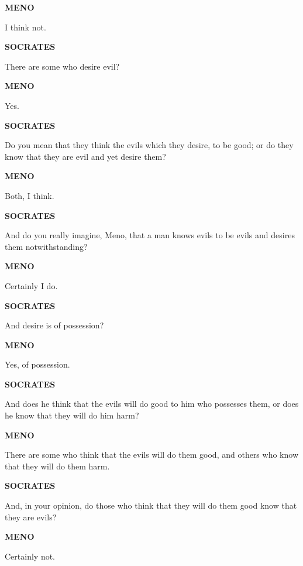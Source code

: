 \documentclass[11pt,letter]{article}
\begin{document}
\par \textbf{MENO}
\par   I think not.

\par \textbf{SOCRATES}
\par   There are some who desire evil?

\par \textbf{MENO}
\par   Yes.

\par \textbf{SOCRATES}
\par   Do you mean that they think the evils which they desire, to be good; or do they know that they are evil and yet desire them?

\par \textbf{MENO}
\par   Both, I think.

\par \textbf{SOCRATES}
\par   And do you really imagine, Meno, that a man knows evils to be evils and desires them notwithstanding?

\par \textbf{MENO}
\par   Certainly I do.

\par \textbf{SOCRATES}
\par   And desire is of possession?

\par \textbf{MENO}
\par   Yes, of possession.

\par \textbf{SOCRATES}
\par   And does he think that the evils will do good to him who possesses them, or does he know that they will do him harm?

\par \textbf{MENO}
\par   There are some who think that the evils will do them good, and others who know that they will do them harm.

\par \textbf{SOCRATES}
\par   And, in your opinion, do those who think that they will do them good know that they are evils?

\par \textbf{MENO}
\par   Certainly not.
\end{document}
